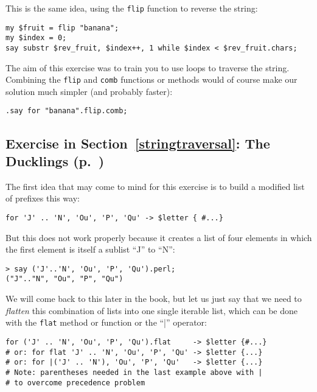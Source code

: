 This is the same idea, using the {\tt flip} function to 
reverse the string:

\begin{verbatim}
my $fruit = flip "banana";
my $index = 0;
say substr $rev_fruit, $index++, 1 while $index < $rev_fruit.chars;
\end{verbatim}
%

The aim of this exercise was to train you to use loops to 
traverse the string. Combining the {\tt flip} and {\tt comb} 
functions or methods would of course make our solution much 
simpler (and probably faster):

\begin{verbatim}
.say for "banana".flip.comb;
\end{verbatim}


\subsection{Exercise in Section~\ref{stringtraversal}: The Ducklings (p.~\pageref{stringtraversal})}
\label{sol_ducklings}

The first idea that may come to mind for this exercise is to build 
a modified list of prefixes this way:

\begin{verbatim}
for 'J' .. 'N', 'Ou', 'P', 'Qu' -> $letter { #...}
\end{verbatim}
%

But this does not work properly because it creates a list 
of four elements in which the first element is itself a 
sublist ``J'' to ``N'':

\begin{verbatim}
> say ('J'..'N', 'Ou', 'P', 'Qu').perl;
("J".."N", "Ou", "P", "Qu")
\end{verbatim}
%

We will come back to this later in the book, but let us just say 
that we need to \emph{flatten} this combination of lists into 
one single iterable list, which can be done with the 
{\tt flat} method or function or the ``|'' operator:

\begin{verbatim}
for ('J' .. 'N', 'Ou', 'P', 'Qu').flat     -> $letter {#...}
# or: for flat 'J' .. 'N', 'Ou', 'P', 'Qu' -> $letter {...}
# or: for |('J' .. 'N'), 'Ou', 'P', 'Qu'   -> $letter {...}
# Note: parentheses needed in the last example above with | 
# to overcome precedence problem
\end{verbatim}
%

